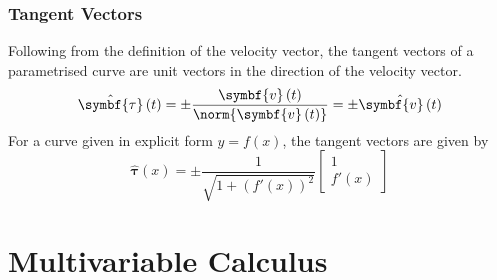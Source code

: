 \documentclass{article}
\begin{document}
\subsubsection{Tangent Vectors}
Following from the definition of the velocity vector, the tangent
vectors of a parametrised curve are unit vectors in the direction of
the velocity vector.
\begin{equation*}
    \hat{\symbf{\tau}}\left( t \right) = \pm \frac{\symbf{v}\left( t \right)}{\norm{\symbf{v}\left( t \right)}} = \pm \hat{\symbf{v}\left( t \right)}
\end{equation*}
For a curve given in explicit form \(y = f\left( x \right)\), the tangent vectors are given by
\begin{equation*}
    \hat{\symbf{\tau}}\left( x \right) = \pm \frac{1}{\sqrt{1 + \left( f'\left( x \right) \right)^2}}
    \begin{bmatrix}
        1 \\
        f'\left( x \right)
    \end{bmatrix}
\end{equation*}
\section{Multivariable Calculus}
\end{document}
